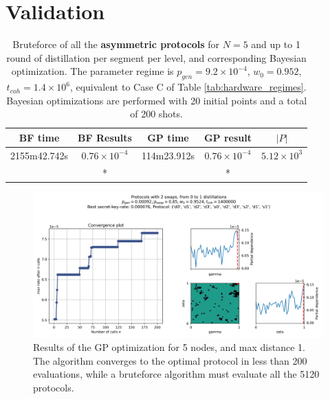 \documentclass{article}
\begin{document}
\section*{Validation}

\begin{table}[ht!]
  \centering
  \begin{tabular}{|c|c|c|c|c|}
      \hline
      BF time & BF Results & GP time & GP result & $|P|$ \\
      \hline
      2155m42.742s & $0.76 \times 10^{-4}$ & 114m23.912s & $0.76 \times 10^{-4}$ & $5.12 \times 10^{3}$ \\
      & *\footnotemark[1] & & *\footnotemark[1] & \\
      \hline
  \end{tabular}
  \caption{Bruteforce of all the \textbf{asymmetric protocols} for $N=5$ and up to 1 round of distillation per segment per level, and corresponding Bayesian optimization. The parameter regime is $p_{gen} = 9.2 \times 10^{-4}$, $w_0 = 0.952$, $t_{coh} = 1.4 \times 10^6$, equivalent to Case C of Table \ref{tab:hardware_regimes}. \\ Bayesian optimizations are performed with 20 initial points and a total of 200 shots.}
  \label{tab:validation_regimes}
\end{table}


\begin{figure}[ht!]
  \centering
  \includegraphics[width=\linewidth, trim=10 10 10 20, clip]{asymmetric/results_gp_tcoh1400000_pgen0.00092_pswap0.85_w00.9524_nodes5_maxdists1/0.9524_2_swaps_skopt_gp.png}
  \caption{Results of the GP optimization for 5 nodes, and max distance 1. The algorithm converges to the optimal protocol in less than 200 evaluations, while a bruteforce algorithm must evaluate all the 5120 protocols.}
  \label{fig:gp_results}
\end{figure}
\end{document}
